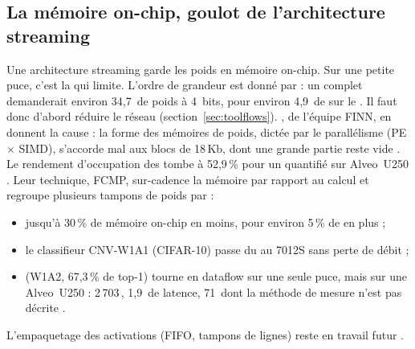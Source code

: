 \subsection{La mémoire on-chip, goulot de l'architecture streaming}

Une architecture streaming garde les poids en mémoire on-chip. Sur une petite puce, c'est
la  qui limite. L'ordre de grandeur est donné par
\citet{arxiv-2609.24757-npu-accelerator-quantized-real-time}\pp{} : un  complet
demanderait environ 34,7\, de poids à 4~bits, pour environ 4,9\, de  sur le
 . Il faut donc d'abord réduire le réseau (section~\ref{sec:toolflows}).
\citet{arxiv-2011.07317-memory-efficient-dataflow-inference-deep}\pp{},
de l'équipe FINN, en donnent la cause : la forme des mémoires de poids, dictée par le
parallélisme (PE $\times$ SIMD), s'accorde mal aux blocs de 18\,Kb, dont une grande partie
reste vide . Le rendement d'occupation des  tombe à 52,9\,\% pour un
 quantifié sur Alveo~U250 . Leur technique, FCMP, sur-cadence la
mémoire par rapport au calcul et regroupe plusieurs tampons de poids par  :
\begin{itemize}
  \item jusqu'à 30\,\% de mémoire on-chip en moins, pour environ 5\,\% de  en plus
     ;
  \item le classifieur CNV-W1A1 (CIFAR-10) passe du  au 7012S sans perte de débit
     ;
  \item {} (W1A2, 67,3\,\% de top-1) tourne en dataflow sur une seule puce, mais sur
    une Alveo~U250 : 2\,703\,, 1,9\, de latence, 71\, dont la méthode de mesure n'est
    pas décrite .
\end{itemize}
L'empaquetage des activations (FIFO, tampons de lignes) reste en travail futur .

